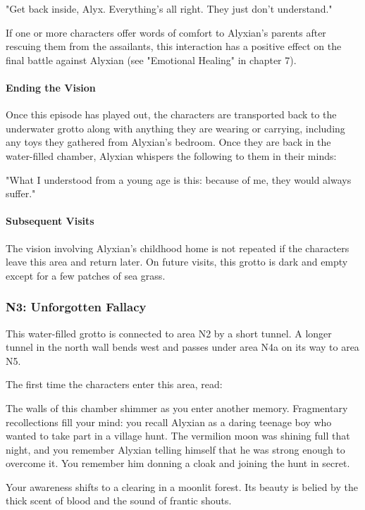 \documentclass[10pt,a4paper,twoside,twocolumn,openany,nodeprecatedcode]{dndbook}
\begin{document}
\begin{DndReadAloud}{}
"Get back inside, Alyx. Everything's all right. They just don't understand."

\end{DndReadAloud}

If one or more characters offer words of comfort to Alyxian's parents after rescuing them from the assailants, this interaction has a positive effect on the final battle against Alyxian (see "Emotional Healing" in chapter 7).

\paragraph{Ending the Vision}
Once this episode has played out, the characters are transported back to the underwater grotto along with anything they are wearing or carrying, including any toys they gathered from Alyxian's bedroom. Once they are back in the water-filled chamber, Alyxian whispers the following to them in their minds:

\begin{DndReadAloud}{}
"What I understood from a young age is this: because of me, they would always suffer."

\end{DndReadAloud}

\paragraph{Subsequent Visits}
The vision involving Alyxian's childhood home is not repeated if the characters leave this area and return later. On future visits, this grotto is dark and empty except for a few patches of sea grass.

\subsubsection{N3: Unforgotten Fallacy}
This water-filled grotto is connected to area N2 by a short tunnel. A longer tunnel in the north wall bends west and passes under area N4a on its way to area N5.

The first time the characters enter this area, read:

\begin{DndReadAloud}{}
The walls of this chamber shimmer as you enter another memory. Fragmentary recollections fill your mind: you recall Alyxian as a daring teenage boy who wanted to take part in a village hunt. The vermilion moon was shining full that night, and you remember Alyxian telling himself that he was strong enough to overcome it. You remember him donning a cloak and joining the hunt in secret.

Your awareness shifts to a clearing in a moonlit forest. Its beauty is belied by the thick scent of blood and the sound of frantic shouts.

\end{DndReadAloud}
\end{document}
